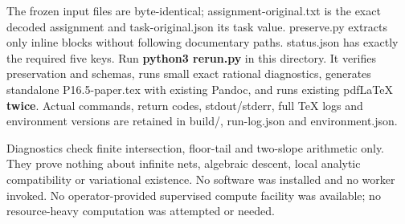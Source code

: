 \documentclass[
  10pt,
]{article}
\begin{document}
The frozen input files are byte-identical; assignment-original.txt is
the exact decoded assignment and task-original.json its task value.
preserve.py extracts only inline blocks without following documentary
paths. status.json has exactly the required five keys. Run
\textbf{python3 rerun.py} in this directory. It verifies preservation
and schemas, runs small exact rational diagnostics, generates standalone
P16.5-paper.tex with existing Pandoc, and runs existing pdfLaTeX
\textbf{twice}. Actual commands, return codes, stdout/stderr, full TeX
logs and environment versions are retained in build/, run-log.json and
environment.json.

Diagnostics check finite intersection, floor-tail and two-slope
arithmetic only. They prove nothing about infinite nets, algebraic
descent, local analytic compatibility or variational existence. No
software was installed and no worker invoked. No operator-provided
supervised compute facility was available; no resource-heavy computation
was attempted or needed.
\end{document}
